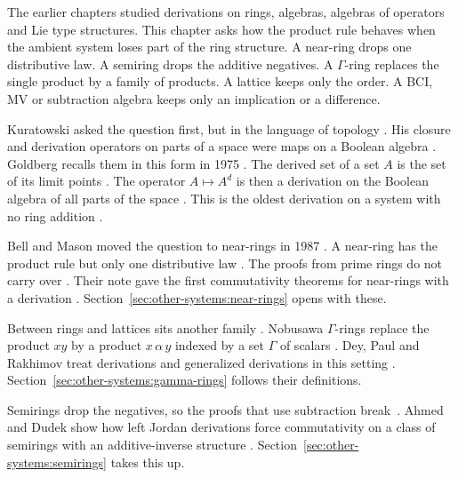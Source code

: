 
The earlier chapters studied derivations on rings, algebras, algebras of
operators and Lie type structures. This chapter asks how the product rule
behaves when the ambient system loses part of the ring structure. A near-ring
drops one distributive law. A semiring drops the additive negatives. A
$\Gamma$-ring replaces the single product by a family of products. A lattice
keeps only the order. A BCI, MV or subtraction algebra keeps only an
implication or a difference.


Kuratowski asked the question first, but in the language of topology
\cite[p.~365]{Goldberg1975}. His closure and derivation operators on parts of
a space were maps on a Boolean algebra \cite[p.~365]{Goldberg1975}. Goldberg
recalls them in this form in 1975 \cite[p.~365]{Goldberg1975}. The derived set
of a set $A$ is the set of its limit points \cite[p.~365]{Goldberg1975}. The
operator $A \mapsto A^{d}$ is then a derivation on the Boolean algebra of all
parts of the space \cite[p.~365]{Goldberg1975}. This is
the oldest derivation on a system with no ring addition
\cite[p.~365]{Goldberg1975}.

Bell and Mason moved the question to near-rings in 1987
\cite[pp.~31--33]{BellMason1987}. A near-ring has the product rule but only
one distributive law \cite[pp.~31--33]{BellMason1987}. The proofs from prime
rings do not carry over \cite[pp.~31--33]{BellMason1987}. Their note gave the
first commutativity theorems for near-rings with a derivation
\cite[pp.~31--33]{BellMason1987}. Section~\ref{sec:other-systems:near-rings}
opens with these.

Between rings and lattices sits another family
\cite[pp.~2--3]{DeyPaulRakhimov2012}. Nobusawa $\Gamma$-rings replace the
product $xy$ by a product $x\, \alpha\, y$ indexed by a set $\Gamma$ of
scalars \cite[pp.~2--3]{DeyPaulRakhimov2012}. Dey, Paul and Rakhimov treat
derivations and generalized derivations in this setting
\cite[pp.~2--3]{DeyPaulRakhimov2012}.
Section~\ref{sec:other-systems:gamma-rings} follows their definitions.

Semirings drop the negatives, so the proofs that use subtraction break~\cite[pp.~624--631]{AhmedDudek2021}. Ahmed
and Dudek show how left Jordan derivations force commutativity on a class
of semirings with an additive-inverse structure
\cite[pp.~624--631]{AhmedDudek2021}.
Section~\ref{sec:other-systems:semirings} takes this up.

